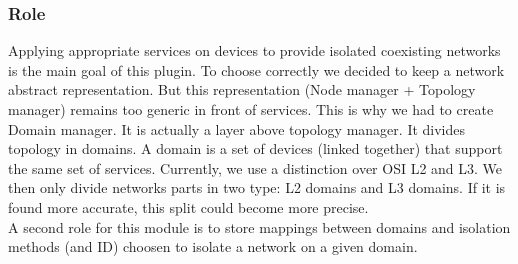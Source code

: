 \subsubsection{Role}
Applying appropriate services on devices to provide isolated coexisting networks is the main goal of this plugin. To choose correctly we decided to keep a network abstract representation. But this representation (Node manager + Topology manager) remains too generic in front of services. This is why we had to create Domain manager. It is actually a layer above topology manager. It divides topology in domains. A domain is a set of devices (linked together) that support the same set of services. Currently, we use a distinction over OSI L2 and L3. We then only divide networks parts in two type: L2 domains and L3 domains. If it is found more accurate, this split could become more precise.\\
A second role for this module is to store mappings between domains and isolation methods (and ID) choosen to isolate a network on a given domain.
